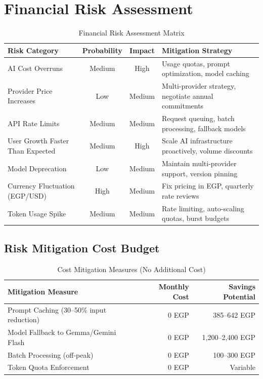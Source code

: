 \documentclass[11pt,a4paper]{article}
\begin{document}
\newpage

\section{Financial Risk Assessment}

\begin{table}[H]
\centering
\footnotesize
\begin{tabular}{|l|c|c|l|}
\hline
\textbf{Risk Category} & \textbf{Probability} & \textbf{Impact} & \textbf{Mitigation Strategy} \\
\hline
AI Cost Overruns & Medium & High & Usage quotas, prompt optimization, model caching \\
\hline
Provider Price Increases & Low & Medium & Multi-provider strategy, negotiate annual commitments \\
\hline
API Rate Limits & Medium & Medium & Request queuing, batch processing, fallback models \\
\hline
User Growth Faster Than Expected & Medium & High & Scale AI infrastructure proactively, volume discounts \\
\hline
Model Deprecation & Low & Medium & Maintain multi-provider support, version pinning \\
\hline
Currency Fluctuation (EGP/USD) & High & Medium & Fix pricing in EGP, quarterly rate reviews \\
\hline
Token Usage Spike & Medium & Medium & Rate limiting, auto-scaling quotas, burst budgets \\
\hline
\end{tabular}
\caption{Financial Risk Assessment Matrix}
\end{table}

\subsection{Risk Mitigation Cost Budget}

\begin{table}[H]
\centering
\begin{tabular}{|l|r|r|}
\hline
\textbf{Mitigation Measure} & \textbf{Monthly Cost} & \textbf{Savings Potential} \\
\hline
Prompt Caching (30--50\% input reduction) & 0 EGP & 385--642 EGP \\
\hline
Model Fallback to Gemma/Gemini Flash & 0 EGP & 1,200--2,400 EGP \\
\hline
Batch Processing (off-peak) & 0 EGP & 100--300 EGP \\
\hline
Token Quota Enforcement & 0 EGP & Variable \\
\hline
\end{tabular}
\caption{Cost Mitigation Measures (No Additional Cost)}
\end{table}
\end{document}
